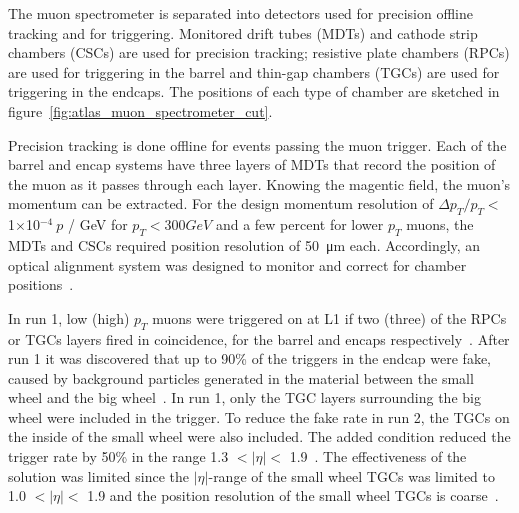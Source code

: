 The muon spectrometer is separated into detectors used for precision offline tracking and for triggering. Monitored drift tubes (MDTs) and cathode strip chambers (CSCs) are used for precision tracking; resistive plate chambers (RPCs) are used for triggering in the barrel and thin-gap chambers (TGCs) are used for triggering in the endcaps. The positions of each type of chamber are sketched in figure~\ref{fig:atlas_muon_spectrometer_cut}. 

Precision tracking is done offline for events passing the muon trigger. Each of the barrel and encap systems have three layers of MDTs that record the position of the muon as it passes through each layer. Knowing the magentic field, the muon's momentum can be extracted. For the design momentum resolution of $\Delta p_T / p_T <$ 1$\times$10$^{-4}~p$ / GeV for $p_T < 300 GeV$ and a few percent for lower $p_T$ muons, the MDTs and CSCs required position resolution of \SI{50}{\micro\meter} each. Accordingly, an optical alignment system was designed to monitor and correct for chamber positions~\cite{atlas_muon_spectrometer_tdr, aefsky_optical_2008}. 

In run 1, low (high) $p_T$ muons were triggered on at L1 if two (three) of the RPCs or TGCs layers fired in coincidence, for the barrel and encaps respectively~\cite{atlas_l1_trigger_tdr}. After run 1 it was discovered that up to 90\% of the triggers in the endcap were fake, caused by background particles generated in the material between the small wheel and the big wheel~\cite{nsw_tdr}. In run 1, only the TGC layers surrounding the big wheel were included in the trigger. To reduce the fake rate in run 2, the TGCs on the inside of the small wheel were also included. The added condition reduced the trigger rate by 50\% in the range 1.3 $< |\eta| <$ 1.9~\cite{martinez_run-2_2016}. The effectiveness of the solution was limited since the $|\eta|$-range of the small wheel TGCs was limited to 1.0 $< |\eta| <$ 1.9 and the position resolution of the small wheel TGCs is coarse~\cite{nsw_tdr}.

